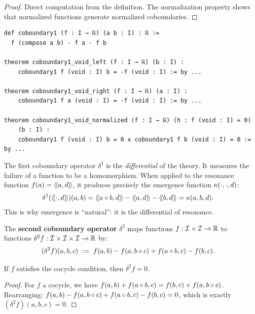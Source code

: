 \begin{proof}
Direct computation from the definition. The normalization property shows that
normalized functions generate normalized coboundaries.
\end{proof}

\begin{lstlisting}[caption={First coboundary operator (IDT\_v3\_Emergence.lean)}]
def coboundary1 (f : I → ℝ) (a b : I) : ℝ :=
  f (compose a b) - f a - f b

theorem coboundary1_void_left (f : I → ℝ) (b : I) :
    coboundary1 f (void : I) b = -f (void : I) := by ...

theorem coboundary1_void_right (f : I → ℝ) (a : I) :
    coboundary1 f a (void : I) = -f (void : I) := by ...

theorem coboundary1_void_normalized (f : I → ℝ) (h : f (void : I) = 0)
    (b : I) :
    coboundary1 f (void : I) b = 0 ∧ coboundary1 f b (void : I) = 0 := by ...
\end{lstlisting}

\begin{interpretation}
The first coboundary operator $\delta^1$ is the \emph{differential} of the
theory. It measures the failure of a function to be a homomorphism. When applied
to the resonance function $f(a) = \langle\!\langle a, d \rangle\!\rangle$, it produces precisely the emergence
function $\kappa(\cdot, \cdot, d)$:
\[
  \delta^1(\rs{\cdot}{d})(a,b) = \rs{a \compose b}{d} - \rs{a}{d} - \rs{b}{d}
  = \emerge(a,b,d).
\]
This is why emergence is ``natural'': it is the differential of resonance.
\end{interpretation}

\begin{definition}
\label{def:coboundary2}
The \textbf{second coboundary operator} $\delta^2$ maps functions
$f : \mathcal{I} \times \mathcal{I} \to \mathbb{R}$ to functions $\delta^2 f : \mathcal{I} \times \mathcal{I} \times \mathcal{I} \to \mathbb{R}$
by:
\[
  (\delta^2 f)(a,b,c) \;:=\; f(a,b) - f(a, b \circ c) + f(a \circ b, c) - f(b,c).
\]
\end{definition}

\begin{theorem}
\label{thm:coboundary2-cocycle}
If $f$ satisfies the cocycle condition, then $\delta^2 f = 0$.
\end{theorem}

\begin{proof}
For $f$ a cocycle, we have $f(a,b) + f(a \circ b, c) = f(b,c) + f(a, b \circ c)$.
Rearranging: $f(a,b) - f(a, b \circ c) + f(a \circ b, c) - f(b,c) = 0$,
which is exactly $(\delta^2 f)(a,b,c) = 0$.
\end{proof}

